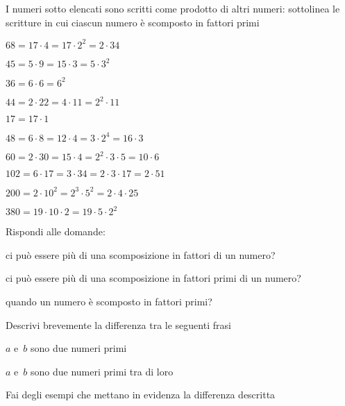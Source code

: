 \begin{esercizio}
I numeri sotto elencati sono scritti come prodotto di altri numeri: sottolinea 
le scritture in cui ciascun
numero è scomposto in fattori primi
\begin{multicols}{2}
 \begin{enumeratea}
 \item \(68=17\cdot4=17\cdot2^2=2\cdot34\)
 \item \(45=5\cdot9=15\cdot3=5\cdot3^2\)
 \item \(36=6\cdot6=6^2\)
 \item \(44=2\cdot22=4\cdot11=2^2\cdot11\)
 \item \(17=17\cdot1\)
 \item \(48=6\cdot8=12\cdot4=3\cdot2^4=16\cdot3\)
 \item \(60= 2\cdot30=15\cdot4=2^2\cdot3\cdot5=10\cdot6\)
 \item \(102=6\cdot17=3\cdot34=2\cdot3\cdot17=2\cdot51\)
 \item \(200=2\cdot10^2=2^3\cdot5^2=2\cdot4\cdot25\)
 \item \(380=19\cdot10\cdot2=19\cdot5\cdot2^2\)
 \end{enumeratea}
\end{multicols}
\end{esercizio}

\begin{esercizio}
 Rispondi alle domande:
 \begin{enumeratea}
 \item ci può essere più di una scomposizione in fattori di un numero?
 \item ci può essere più di una scomposizione in fattori primi di un numero?
 \item quando un numero è scomposto in fattori primi?
 \end{enumeratea}
\end{esercizio}

\begin{esercizio}
Descrivi brevemente la differenza tra le seguenti frasi
\begin{enumeratea}
 \item \(a\) e~\(b\) sono due numeri primi
 \item \(a\) e~\(b\) sono due numeri primi tra di loro
\end{enumeratea}
Fai degli esempi che mettano in evidenza la differenza descritta
\end{esercizio}


